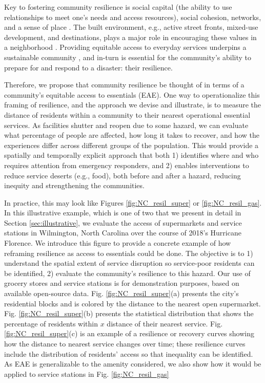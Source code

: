\documentclass[onecolumn,doublespacing]{risa}
\let \cite \parencite
\begin{document}
Key to fostering community resilience is social capital (the ability to use relationships to meet one's needs and access resources), social cohesion, networks, and a sense of place \cite{Dempsey2011-og,Berkes2013-jr, Cutter2008-placeBasedModel}.
The built environment, e.g., active street fronts, mixed-use development, and destinations, plays a major role in encouraging these values in a neighborhood \cite{Bramley2009-ol, Talen1999-sx,Frumkin2004-yi}.
Providing equitable access to everyday services underpins a sustainable community \cite{Dempsey2011-og}, and in-turn is essential for the community's ability to prepare for and respond to a disaster: their resilience.

Therefore, we propose that community resilience be thought of in terms of a community's equitable access to essentials (EAE).
One way to operationalize this framing of resilience, and the approach we devise and illustrate, is to measure the distance of residents within a community to their nearest operational essential services. 
As facilities shutter and reopen due to some hazard, we can evaluate what percentage of people are affected, how long it takes to recover, and how the experiences differ across different groups of the population. 
This would provide a spatially and temporally explicit approach that both 1) identifies where and who requires attention from emergency responders, and 2) enables interventions to reduce service deserts (e.g., food), both before and after a hazard, reducing inequity and strengthening the communities.

In practice, this may look like Figures \ref{fig:NC_resil_super} or \ref{fig:NC_resil_gas}.
In this illustrative example, which is one of two that we present in detail in Section \ref{sec:illustrative}, we evaluate the access of supermarkets and service stations in Wilmington, North Carolina over the course of 2018's Hurricane Florence.
We introduce this figure to provide a concrete example of how reframing resilience as access to essentials could be done.
The objective is to 1) understand the spatial extent of service disruption so service-poor residents can be identified, 2) evaluate the community's resilience to this hazard. 
Our use of grocery stores and service stations is for demonstration purposes, based on available open-source data.
Fig. \ref{fig:NC_resil_super}(a) presents the city's residential blocks and is colored by the distance to the nearest open supermarket.
Fig. \ref{fig:NC_resil_super}(b) presents the statistical distribution that shows the percentage of residents within $x$ distance of their nearest service.
Fig. \ref{fig:NC_resil_super}(c) is an example of a resilience or recovery curves showing how the distance to nearest service changes over time; these resilience curves include the distribution of residents' access so that inequality can be identified.
As EAE is generalizable to the amenity considered, we also show how it would be applied to service stations in Fig. \ref{fig:NC_resil_gas}
\end{document}
